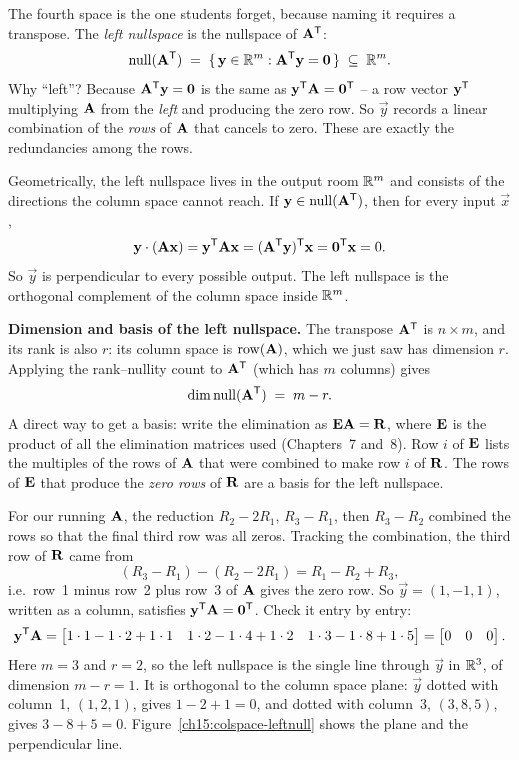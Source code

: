 The fourth space is the one students forget, because naming it requires a transpose. The
\emph{left nullspace} is the nullspace of $\mathbf{A}^{\mathsf{T}}$:
\[
  \operatorname{null}(\mathbf{A}^{\mathsf{T}}) \;=\; \{\,\mathbf{y}\in\mathbb{R}^m : \mathbf{A}^{\mathsf{T}}\mathbf{y}=\mathbf{0}\,\} \;\subseteq\; \mathbb{R}^m.
\]
Why ``left''? Because $\mathbf{A}^{\mathsf{T}}\mathbf{y}=\mathbf{0}$ is the same as $\mathbf{y}^{\mathsf{T}}\mathbf{A}=\mathbf{0}^{\mathsf{T}}$ -- a
row vector $\mathbf{y}^{\mathsf{T}}$ multiplying $\mathbf{A}$ from the \emph{left} and producing the zero row. So
$\vec{y}$ records a linear combination of the \emph{rows} of $\mathbf{A}$ that cancels to zero. These
are exactly the redundancies among the rows.

Geometrically, the left nullspace lives in the output room $\mathbb{R}^m$ and consists of the directions
the column space cannot reach. If $\mathbf{y}\in\operatorname{null}(\mathbf{A}^{\mathsf{T}})$, then for every input $\vec{x}$,
\[
  \mathbf{y}\cdot(\mathbf{A}\mathbf{x}) = \mathbf{y}^{\mathsf{T}}\mathbf{A}\mathbf{x} = (\mathbf{A}^{\mathsf{T}}\mathbf{y})^{\mathsf{T}}\mathbf{x}
  = \mathbf{0}^{\mathsf{T}}\mathbf{x}=0.
\]
So $\vec{y}$ is perpendicular to every possible output. The left nullspace is the orthogonal
complement of the column space inside $\mathbb{R}^m$.

\begin{formalbox}
\textbf{Dimension and basis of the left nullspace.} The transpose $\mathbf{A}^{\mathsf{T}}$ is $n\times m$, and
its rank is also $r$: its column space is $\operatorname{row}(\mathbf{A})$, which we just saw has dimension $r$.
Applying the rank--nullity count to $\mathbf{A}^{\mathsf{T}}$ (which has $m$ columns) gives
\[
  \operatorname{dim} \operatorname{null}(\mathbf{A}^{\mathsf{T}}) \;=\; m - r.
\]
A direct way to get a basis: write the elimination as $\mathbf{E}\mathbf{A}=\mathbf{R}$, where $\mathbf{E}$
is the product of all the elimination matrices used (Chapters~7 and~8). Row $i$ of $\mathbf{E}$ lists
the multiples of the rows of $\mathbf{A}$ that were combined to make row $i$ of $\mathbf{R}$. The rows
of $\mathbf{E}$ that produce the \emph{zero rows} of $\mathbf{R}$ are a basis for the left nullspace.
\end{formalbox}

\begin{example}\label{ch15:leftnull}
For our running $\mathbf{A}$, the reduction $R_2-2R_1$, $R_3-R_1$, then $R_3-R_2$ combined the rows
so that the final third row was all zeros. Tracking the combination, the third row of $\mathbf{R}$
came from
\[
  (R_3 - R_1) - (R_2 - 2R_1) = R_1 - R_2 + R_3,
\]
i.e.\ row~1 minus row~2 plus row~3 of $\mathbf{A}$ gives the zero row. So
$\vec{y}=(1,-1,1)$, written as a column, satisfies $\mathbf{y}^{\mathsf{T}}\mathbf{A}=\mathbf{0}^{\mathsf{T}}$. Check it
entry by entry:
\[
  \mathbf{y}^{\mathsf{T}}\mathbf{A}
  = \begin{bmatrix} 1\cdot1 - 1\cdot2 + 1\cdot1 & 1\cdot2-1\cdot4+1\cdot2 & 1\cdot3-1\cdot8+1\cdot5 \end{bmatrix}
  = \begin{bmatrix} 0 & 0 & 0 \end{bmatrix}.
\]
Here $m=3$ and $r=2$, so the left nullspace is the single line through $\vec{y}$ in $\mathbb{R}^3$,
of dimension $m-r=1$. It is orthogonal to the column space plane: $\vec{y}$ dotted with
column~1, $(1,2,1)$, gives $1-2+1=0$, and dotted with column~3, $(3,8,5)$, gives $3-8+5=0$.
Figure~\ref{ch15:colspace-leftnull} shows the plane and the perpendicular line.
\end{example}

